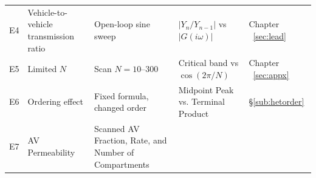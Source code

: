 \documentclass[11pt,a4paper,openany]{book}
\numberwithin{equation}{chapter}
\numberwithin{figure}{chapter}
\numberwithin{table}{chapter}
\begin{document}
\begin{center}
\begin{tabular}{p{0.85cm}p{2.3cm}p{3.5cm}p{4.2cm}p{2.7cm}}
\\
E4 &




 Vehicle-to-vehicle transmission ratio




&




 Open-loop sine sweep




& $|Y_n/Y_{n-1}|$ vs $|G(i\omega)|$ &




 Chapter ~\ref{sec:lead}~



\\
E5 &




 Limited $N$




&




 Scan $N=10$--$300$




&




 Critical band vs $\cos(2\pi/N)$




&




 Chapter ~\ref{sec:appx}~



\\
E6 &




 Ordering effect




&




 Fixed formula, changed order




&




 Midpoint Peak vs. Terminal Product




& \S\ref{sub:hetorder} \\
E7 &




 AV Permeability




&




 Scanned AV Fraction, Rate, and Number of Compartments





\end{tabular}
\end{center}
\end{document}
